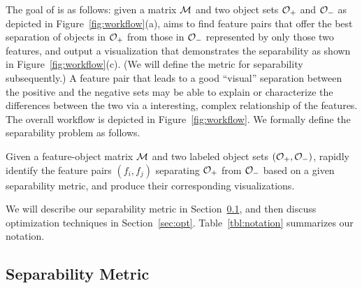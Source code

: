 The goal of \genviz is as follows: given a matrix ${\mathcal{M}}$ and two object sets ${\mathcal{O}}_+$ and ${\mathcal{O}}_-$ as depicted in Figure~\ref{fig:workflow}(a), \genviz aims to find feature pairs that offer the best separation of objects in ${\mathcal{O}}_+$ from those in ${\mathcal{O}}_-$ represented by only those two features, and output a visualization that demonstrates the separability as shown in Figure~\ref{fig:workflow}(c). (We will define the metric for separability subsequently.) A feature pair that leads to a good ``visual'' separation between the positive and the negative sets may be able to explain or characterize the differences between the two via a interesting, complex relationship of the features. The overall workflow is depicted in Figure~\ref{fig:workflow}.
We formally define the separability problem as follows.
\begin{formulation}[Separability]\label{prob:separability}
Given a feature-object matrix ${\mathcal{M}}$ and two labeled object sets $({\mathcal{O}}_+,{\mathcal{O}}_-)$, rapidly identify the \topk feature pairs $(f_i,f_j)$ separating ${\mathcal{O}}_+$ from ${\mathcal{O}}_-$ based on a given separability metric, and produce their corresponding {visualizations}.
\end{formulation}
\noindent %
We will describe our separability metric in Section~\ref{sec:metric}, and then discuss optimization techniques in Section~\ref{sec:opt}. Table~\ref{tbl:notation} summarizes our notation.



\subsection{Separability Metric}\label{sec:metric}

